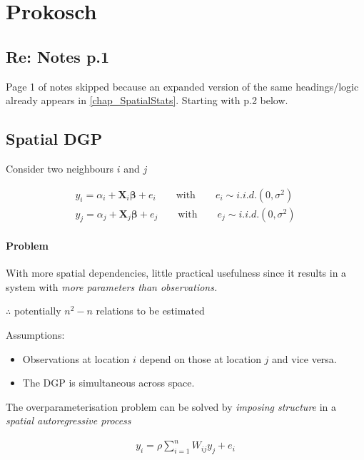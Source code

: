 
\section{Prokosch}

\subsection{Re: Notes p.1}
Page 1 of notes skipped because an expanded version of the same headings/logic already appears in \ref{chap_SpatialStats}. Starting with p.2 below.

\subsection{Spatial DGP}
Consider two neighbours $i$ and $j$

\begin{eqnarray}
y_{i} = \alpha_{i} + \boldsymbol{X}_{i}\boldsymbol{\beta} + e_{i} \qquad \text{with} \qquad e_i \sim i.i.d.(0, \sigma^{2}) \\
y_{j} = \alpha_{j} + \boldsymbol{X}_{j}\boldsymbol{\beta} + e_{j} \qquad \text{with} \qquad e_j \sim i.i.d.(0, \sigma^{2})
\end{eqnarray}

\paragraph{Problem} 
With more spatial dependencies, little practical usefulness since it results in a system with \emph{more parameters than observations.}

$\therefore$ potentially $n^2 - n$ relations to be estimated

Assumptions:

\begin{itemize}
\item Observations at location $i$ depend on those at location $j$ and vice versa.
\item The DGP is simultaneous across space.
\end{itemize}

The overparameterisation problem can be solved by \emph{imposing structure} in a \emph{spatial autoregressive process}

\begin{eqnarray}\label{eqn_spatialDGP}
y_{i} = \rho \sum_{i=1}^{n} W_{ij} y_{j} + e_{i}
\end{eqnarray}

